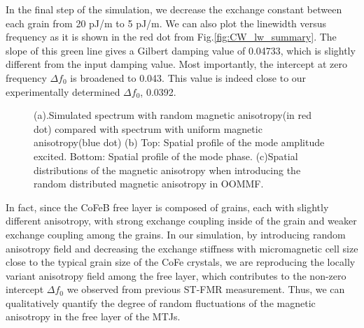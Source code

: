 In the final step of the simulation, we decrease the exchange constant between each grain from 20 pJ/m to  5 pJ/m. We can also plot the linewidth versus frequency as it is shown in the red dot from Fig.\ref{fig:CW_lw_summary}. The slope of this green line gives a Gilbert damping value of 0.04733, which is slightly different from the input damping value. Most importantly, the intercept  at zero frequency $\Delta f_0$ is broadened to  0.043. This value is indeed close to our experimentally determined $\Delta f_0$, 0.0392.  

\begin{figure}[t]
\centering     
{}
\caption{(a).Simulated spectrum with random magnetic anisotropy(in red dot) compared with spectrum with uniform magnetic anisotropy(blue dot) (b) Top: Spatial profile of the mode amplitude excited. Bottom: Spatial profile of the mode phase. (c)Spatial distributions of the magnetic anisotropy when introducing the random distributed magnetic anisotropy in OOMMF.}
\end{figure}


In fact, since the CoFeB free layer is composed of grains, each with slightly different anisotropy, with strong exchange coupling inside of the grain and weaker exchange coupling among the grains\cite{grain}. In our simulation, by introducing random anisotropy field and decreasing the exchange stiffness with micromagnetic cell size close to the typical grain size of the CoFe crystals, we are reproducing the locally variant anisotropy field among the free layer, which contributes to the non-zero intercept $\Delta f_0$ we observed from previous ST-FMR measurement. Thus, we can qualitatively quantify the degree of random fluctuations of the magnetic anisotropy in the free layer of the MTJs.  



